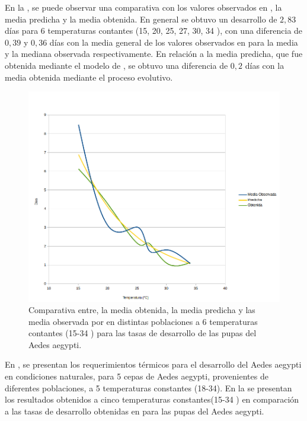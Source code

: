 En la , se puede observar una comparativa con los
valores observados en \cite{rueda1990temperature}, la media predicha y la media obtenida. En
general se obtuvo un desarrollo de $2,83$ días para 6 temperaturas contantes (15, 20, 25, 27,
30, 34 \textcelsius), con una diferencia de $0,39$ y $0,36$ días con la media general de los
valores observados en \cite{rueda1990temperature} para la media y la mediana observada respectivamente. En relación a la media predicha, que fue obtenida mediante el modelo de
\cite{sharpe1977reaction}, se obtuvo una diferencia de $0,2$ días con la media obtenida mediante el
proceso evolutivo.

\begin{figure}[!htbp]
    \centering
    \includegraphics[width=1\textwidth]{capitulo-6/graphics/desarrollo-pupa-rueda.png}
    \caption{\label{fig:desarrollo-pupa-rueda1990}
    Comparativa entre, la media obtenida, la media predicha y las media observada por \cite{
    rueda1990temperature} en distintas poblaciones a 6 temperaturas contantes (15-34 \textcelsius)
    para las tasas de desarrollo de las pupas del Aedes aegypti.}

\end{figure}

En \cite{BESERRA2006}, se presentan los requerimientos térmicos para el desarrollo del Aedes
aegypti en condiciones naturales, para 5 cepas de Aedes aegypti, provenientes de diferentes
poblaciones, a 5 temperaturas constantes (18-34\textcelsius). En la
 se presentan los resultados obtenidos a cinco
temperaturas constantes(15-34 \textcelsius) en comparación a las tasas de desarrollo obtenidas en
\cite{BESERRA2006} para las pupas del Aedes aegypti.

